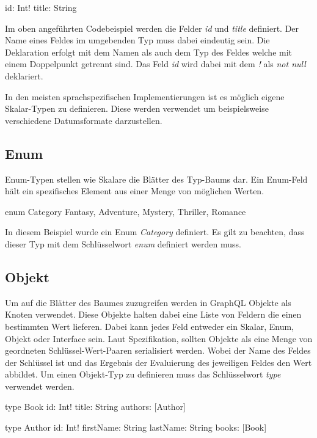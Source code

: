 \begin{JsCode}
    id: Int!
    title: String
\end{JsCode}

Im oben angeführten Codebeispiel werden die Felder \textit{id} und \textit{title} definiert.
Der Name eines Feldes im umgebenden Typ muss dabei eindeutig sein.
Die Deklaration erfolgt mit dem Namen als auch dem Typ des Feldes welche mit einem Doppelpunkt getrennt sind.
Das Feld \textit{id} wird dabei mit dem \textit{!} als \textit{not null} deklariert.



In den meisten sprachspezifischen Implementierungen ist es möglich eigene Skalar-Typen zu definieren. Diese werden verwendet um beispielsweise verschiedene Datumsformate darzustellen.

\subsection{Enum}

Enum-Typen stellen wie Skalare die Blätter des Typ-Baums dar.
Ein Enum-Feld hält ein spezifisches Element aus einer Menge von möglichen Werten.

\begin{JsCode}
enum Category {
    Fantasy,
    Adventure,
    Mystery,
    Thriller,
    Romance
}
\end{JsCode}

In diesem Beispiel wurde ein Enum \textit{Category} definiert.
Es gilt zu beachten, dass dieser Typ mit dem Schlüsselwort \textit{enum} definiert werden muss.

\subsection{Objekt}
Um auf die Blätter des Baumes zuzugreifen werden in GraphQL Objekte als Knoten verwendet.
Diese Objekte halten dabei eine Liste von Feldern die einen bestimmten Wert lieferen.
Dabei kann jedes Feld entweder ein Skalar, Enum, Objekt oder Interface sein.
Laut Spezifikation, sollten Objekte als eine Menge von geordneten Schlüssel-Wert-Paaren serialisiert werden.
Wobei der Name des Feldes der Schlüssel ist und das Ergebnis der Evaluierung des jeweiligen Feldes den Wert abbildet.
Um einen Objekt-Typ zu definieren muss das Schlüsselwort \textit{type} verwendet werden.

\begin{JsCode}
type Book {
    id: Int!
    title: String
    authors: [Author]
}
    
type Author {
    id: Int!
    firstName: String
    lastName: String
    books: [Book]
}
\end{JsCode}

